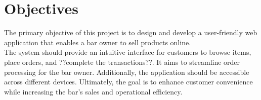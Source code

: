 \section{Objectives}

The primary objective of this project is to design and develop a user-friendly web application that enables a bar owner to sell products online.\\
The system should provide an intuitive interface for customers to browse items, place orders, and ??complete the transactions??. It aims to streamline order processing for the bar owner.
Additionally, the application should be accessible across different devices.
Ultimately, the goal is to enhance customer convenience while increasing the bar's sales and operational efficiency.
